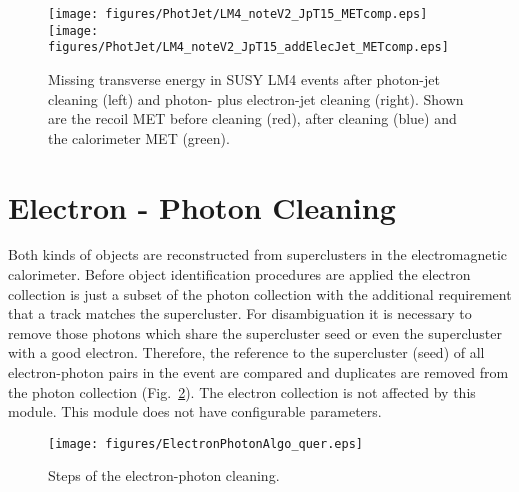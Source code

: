 \documentclass{cmspaper}
\begin{document}
\begin{figure}[hbtp]
  \begin{center}
      \texttt{[image: figures/PhotJet/LM4\_noteV2\_JpT15\_METcomp.eps]}
      \texttt{[image: figures/PhotJet/LM4\_noteV2\_JpT15\_addElecJet\_METcomp.eps]}
    \caption{Missing transverse energy in SUSY LM4 events after photon-jet
    cleaning (left) and photon- plus electron-jet cleaning (right). Shown are
    the recoil MET before cleaning (red), after cleaning (blue) and the
    calorimeter MET (green).}
    \label{fig:pjLM4MET}
  \end{center}
\end{figure}



\clearpage
\section{Electron - Photon Cleaning}
Both kinds of objects are reconstructed from superclusters in the
electromagnetic calorimeter. Before object identification procedures are
applied the electron collection is just a subset of the photon collection with
the additional requirement that a track matches the supercluster. For
disambiguation it is necessary to remove those photons which share the
supercluster seed or even the supercluster with a good electron.  Therefore, the
reference to the supercluster (seed) of all electron-photon pairs in the event
are compared and duplicates are removed from the photon collection
(Fig.~\ref{fig:EPCleaning}). The electron collection is not affected by this
module. This module does not have configurable parameters.

\begin{figure}[hbt]
\begin{center}
\texttt{[image: figures/ElectronPhotonAlgo\_quer.eps]}
\caption{Steps of the electron-photon cleaning.}
\label{fig:EPCleaning}
\end{center}
\end{figure}

\end{document}
